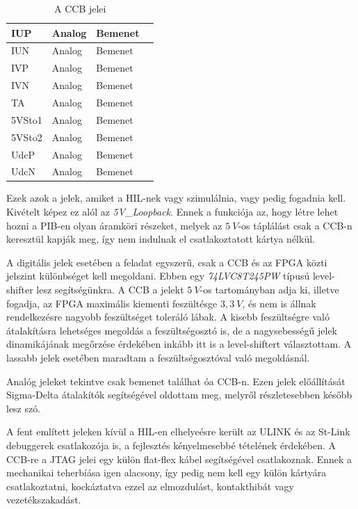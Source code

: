 \begin{table}[]
\begin{tabular}{|l|l|l|l|}
IUP            & Analog       & Bemenet      &                                 \\ \hline
IUN            & Analog       & Bemenet      &                                 \\ \hline
IVP            & Analog       & Bemenet      &                                 \\ \hline
IVN            & Analog       & Bemenet      &                                 \\ \hline
TA             & Analog       & Bemenet      &                                 \\ \hline
5VSto1         & Analog       & Bemenet      &                                 \\ \hline
5VSto2         & Analog       & Bemenet      &                                 \\ \hline
UdcP           & Analog       & Bemenet      &                                 \\ \hline
UdcN           & Analog       & Bemenet      &                                 \\ \hline
\end{tabular}
\caption{A CCB jelei}
\label{ccbsignals}
\end{table}

Ezek azok a jelek, amiket a HIL-nek vagy szimulálnia, vagy pedig fogadnia kell. Kivételt képez ez alól az \emph{5V\_Loopback}. Ennek a funkciója az, hogy létre lehet hozni a PIB-en olyan áramköri részeket, melyek az $5\ V$-os táplálást csak a CCB-n keresztül kapják meg, így nem indulnak el csatlakoztatott kártya nélkül.

A digitális jelek esetében a feladat egyszerű, csak a CCB és az FPGA közti jelszint különbséget kell megoldani. Ebben egy \emph{74LVC8T245PW} típusú level-shifter lesz segítségünkra. A CCB a jelekt $5\ V$-os tartományban adja ki, illetve fogadja, az FPGA maximális kiementi feszültésge $3,3\ V$, és nem is állnak rendelkezésre nagyobb feszültséget toleráló lábak. A kisebb feszültségre való átalakításra lehetséges megoldás a feszültségosztó is, de a nagysebességű jelek dinamikájának megőrzése érdekében inkább itt is a level-shiftert választottam. A lassabb jelek esetében maradtam a feszültségosztóval való megoldásnál.

Analóg jeleket tekintve csak bemenet találhat óa CCB-n. Ezen jelek előállítását Sigma-Delta átalakítók segítségével oldottam meg, melyről részletesebben később lesz szó.

A fent említett jeleken kívül a HIL-en elhelyeésre került az ULINK és az St-Link debuggerek csatlakozója is, a fejlesztés kényelmesebbé tételének érdekében. A CCB-re a JTAG jelei egy külön flat-flex kábel segítségével csatlakoznak. Ennek a mechanikai teherbíása igen alacsony, így pedig nem kell egy külön kártyára csatlakoztatni, kockáztatva ezzel az elmozdulást, kontakthibát vagy vezetékszakadást.

